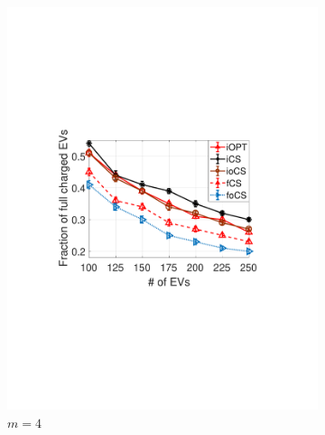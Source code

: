 \documentclass[11pt]{article}
\begin{document}
\begin{figure}[t]
\begin{subfigure}[b]{0.3\textwidth}
\begin{center}
						\includegraphics[width=\textwidth]{acc-M4.pdf}
						\caption{$m=4$}
						\label{fig:acc-M4}
					\end{center}
				\end{subfigure}%
				\begin{subfigure}[b]{0.3\textwidth}
					\begin{center}

\end{center}
\end{subfigure}
\end{figure}
\end{document}
